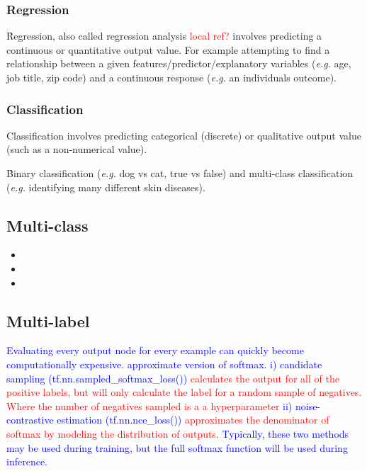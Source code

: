 \subsubsection{Regression} 

\r{Regression, also called regression analysis \textcolor{red}{local ref?} involves predicting a continuous or quantitative output value. For example attempting to find a relationship between a given features/predictor/explanatory variables (\textit{e.g.} age, job title, zip code) and a continuous response (\textit{e.g.} an individuals outcome).}

\subsubsection{Classification} 

Classification involves predicting categorical (discrete) or qualitative output value (such as a non-numerical value). 

\r{Binary classification (\textit{e.g.} dog vs cat, true vs false) and multi-class classification (\textit{e.g.} identifying many different skin diseases).}

\subsection{Multi-class}

\begin{itemize}[noitemsep,topsep=0pt]
	\item {}
	\item {}
	\item {}
\end{itemize}


\subsection{Multi-label}


\textcolor{blue}{Evaluating every output node for every example can quickly become computationally expensive. approximate version of softmax. i) candidate sampling (tf.nn.sampled\_softmax\_loss()) \textcolor{red}{calculates the output for all of the positive labels, but will only calculate the label for a random sample of negatives. Where the number of negatives sampled is a a hyperparameter} ii) noise-contrastive estimation (tf.nn.nce\_loss()) \textcolor{red}{approximates the denominator of softmax by modeling the distribution of outputs}. Typically, these two methods may be used during training, but the full softmax function will be used during inference.}


